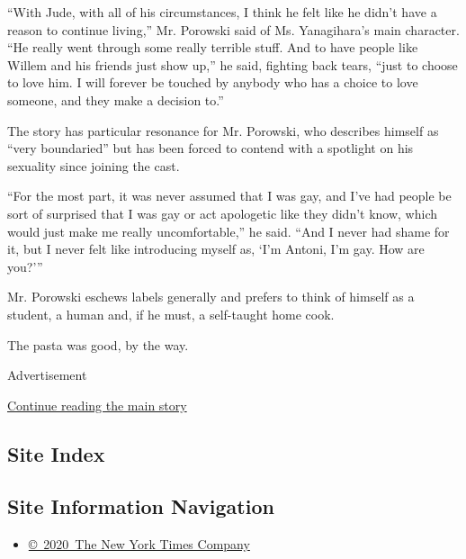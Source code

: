 ``With Jude, with all of his circumstances, I think he felt like he
didn't have a reason to continue living,'' Mr. Porowski said of Ms.
Yanagihara's main character. ``He really went through some really
terrible stuff. And to have people like Willem and his friends just show
up,'' he said, fighting back tears, ``just to choose to love him. I will
forever be touched by anybody who has a choice to love someone, and they
make a decision to.''

The story has particular resonance for Mr. Porowski, who describes
himself as ``very boundaried'' but has been forced to contend with a
spotlight on his sexuality since joining the cast.

``For the most part, it was never assumed that I was gay, and I've had
people be sort of surprised that I was gay or act apologetic like they
didn't know, which would just make me really uncomfortable,'' he said.
``And I never had shame for it, but I never felt like introducing myself
as, `I'm Antoni, I'm gay. How are you?'''

Mr. Porowski eschews labels generally and prefers to think of himself as
a student, a human and, if he must, a self-taught home cook.

The pasta was good, by the way.

Advertisement

\protect\hyperlink{after-bottom}{Continue reading the main story}

\hypertarget{site-index}{%
\subsection{Site Index}\label{site-index}}

\hypertarget{site-information-navigation}{%
\subsection{Site Information
Navigation}\label{site-information-navigation}}

\begin{itemize}
\tightlist
\item
  \href{https://help.nytimes3xbfgragh.onion/hc/en-us/articles/115014792127-Copyright-notice}{©~2020~The
  New York Times Company}
\end{itemize}

